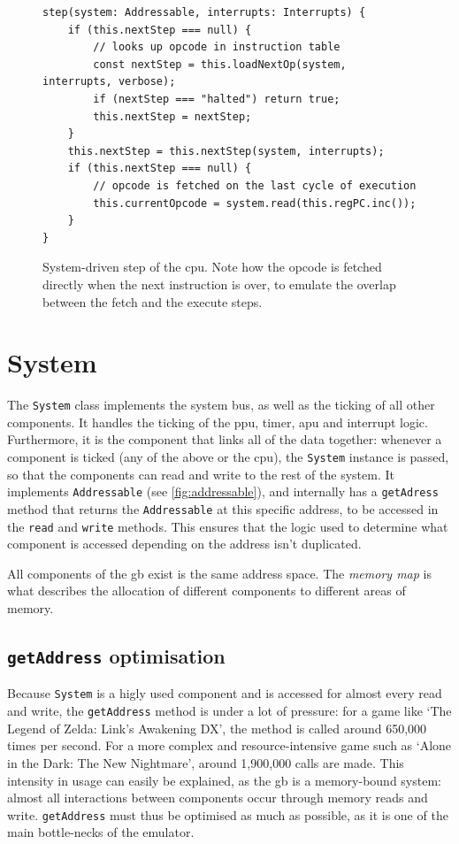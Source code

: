 \documentclass[11pt]{informatics-report}
\begin{document}
\begin{figure}[h]
    \begin{verbatim}
step(system: Addressable, interrupts: Interrupts) {
    if (this.nextStep === null) {
        // looks up opcode in instruction table
        const nextStep = this.loadNextOp(system, interrupts, verbose);
        if (nextStep === "halted") return true;
        this.nextStep = nextStep;
    }
    this.nextStep = this.nextStep(system, interrupts);
    if (this.nextStep === null) {
        // opcode is fetched on the last cycle of execution
        this.currentOpcode = system.read(this.regPC.inc());
    }
}
    \end{verbatim}
    \caption{System-driven step of the \gls{cpu}. Note how the opcode is fetched directly when the next instruction is over, to emulate the overlap between the fetch and the execute steps.}
    \label{fig:system-driven-cpu-tick}
\end{figure}


\section{System}

The \texttt{System} class implements the system bus, as well as the ticking of all other components. It handles the ticking of the \gls{ppu}, timer, \gls{apu} and interrupt logic. Furthermore, it is the component that links all of the data together: whenever a component is ticked (any of the above or the \gls{cpu}), the \texttt{System} instance is passed, so that the components can read and write to the rest of the system. It implements \texttt{Addressable} (see \ref{fig:addressable}), and internally has a \texttt{getAdress} method that returns the \texttt{Addressable} at this specific address, to be accessed in the \texttt{read} and \texttt{write} methods. This ensures that the logic used to determine what component is accessed depending on the address isn't duplicated.

All components of the \glsdesc{gb} exist is the same address space. The \textit{memory map} is what describes the allocation of different components to different areas of memory.

\subsection{\texttt{getAddress} optimisation}

Because \texttt{System} is a higly used component and is accessed for almost every read and write, the \texttt{getAddress} method is under a lot of pressure: for a game like `The Legend of Zelda: Link's Awakening DX', the method is called around 650,000 times per second. For a more complex and resource-intensive game such as `Alone in the Dark: The New Nightmare', around 1,900,000 calls are made. This intensity in usage can easily be explained, as the \gls{gb} is a memory-bound system: almost all interactions between components occur through memory reads and write. \texttt{getAddress} must thus be optimised as much as possible, as it is one of the main bottle-necks of the emulator.
\end{document}
